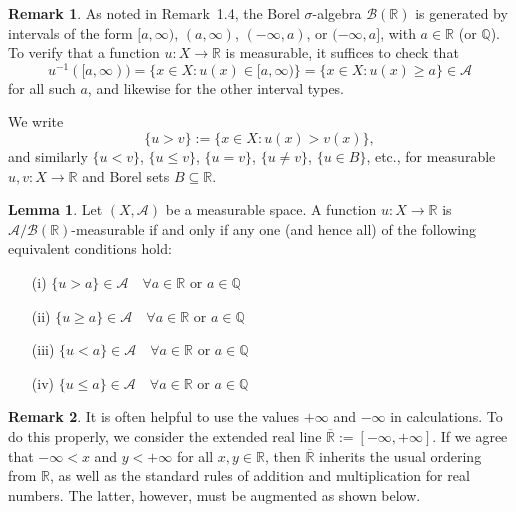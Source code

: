 \documentclass[12pt]{article}
\theoremstyle{definition}
\newtheorem{lemma}[theorem]{Lemma}
\newtheorem{remark}{Remark}[section]
\begin{document}
\medskip
\begin{remark}
As noted in Remark~1.4, the Borel \( \sigma \)-algebra \( \mathcal{B}(\mathbb{R}) \) is generated by intervals of the form \( [a, \infty) \), \( (a, \infty) \), \( (-\infty, a) \), or \( (-\infty, a] \), with \( a \in \mathbb{R} \) (or \( \mathbb{Q} \)). To verify that a function \( u : X \to \mathbb{R} \) is measurable, it suffices to check that
\[
u^{-1}([a, \infty)) = \{ x \in X : u(x) \in [a, \infty) \} = \{ x \in X : u(x) \geq a \} \in \mathcal{A}
\]
for all such \( a \), and likewise for the other interval types.
\end{remark}

We write
\[
\{ u > v \} := \{ x \in X : u(x) > v(x) \},
\]
and similarly \( \{ u < v \} \), \( \{ u \leq v \} \), \( \{ u = v \} \), \( \{ u \neq v \} \), \( \{ u \in B \} \), etc., for measurable \( u, v : X \to \mathbb{R} \) and Borel sets \( B \subseteq \mathbb{R} \).

\medskip
\begin{lemma}
Let \( (X, \mathcal{A}) \) be a measurable space. A function \( u : X \to \mathbb{R} \) is \( \mathcal{A}/\mathcal{B}(\mathbb{R}) \)-measurable if and only if any one (and hence all) of the following equivalent conditions hold:
\begin{multicols}{2}
\begin{itemize}
  \item[(i)] \( \{ u > a \} \in \mathcal{A} \quad \forall a \in \mathbb{R} \text{ or } a \in \mathbb{Q} \)
  \item[(ii)] \( \{ u \geq a \} \in \mathcal{A} \quad \forall a \in \mathbb{R} \text{ or } a \in \mathbb{Q} \)
  \item[(iii)] \( \{ u < a \} \in \mathcal{A} \quad \forall a \in \mathbb{R} \text{ or } a \in \mathbb{Q} \)
  \item[(iv)] \( \{ u \leq a \} \in \mathcal{A} \quad \forall a \in \mathbb{R} \text{ or } a \in \mathbb{Q} \)
\end{itemize}
\end{multicols}
\end{lemma}

\medskip
\begin{remark}
It is often helpful to use the values \( +\infty \) and \( -\infty \) in calculations. To do this properly, we consider the extended real line \( \overline{\mathbb{R}} := [-\infty, +\infty] \). If we agree that \( -\infty < x \) and \( y < +\infty \) for all \( x, y \in \mathbb{R} \), then \( \overline{\mathbb{R}} \) inherits the usual ordering from \( \mathbb{R} \), as well as the standard rules of addition and multiplication for real numbers. The latter, however, must be augmented as shown below.
\end{remark}
\end{document}
